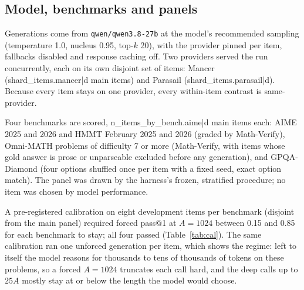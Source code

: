 \documentclass[11pt]{article}
\begin{document}
\subsection{Model, benchmarks and panels}

Generations come from \texttt{qwen/qwen3.8-27b} at the model's recommended sampling (temperature 1.0,
nucleus 0.95, top-$k$ 20), with the provider pinned per item, fallbacks disabled and response caching
off. Two providers served the run concurrently, each on its own disjoint set of items: Mancer
({{shard_items.mancer|d}} main items) and Parasail ({{shard_items.parasail|d}}). Because every item stays on
one provider, every within-item contrast is same-provider.

Four benchmarks are scored, {{n_items_by_bench.aime|d}} main items each: AIME 2025 and 2026 and HMMT
February 2025 and 2026 (graded by Math-Verify), Omni-MATH problems of difficulty 7 or more (Math-Verify,
with items whose gold answer is prose or unparseable excluded before any generation), and GPQA-Diamond
(four options shuffled once per item with a fixed seed, exact option match). The panel was drawn by the
harness's frozen, stratified procedure; no item was chosen by model performance.

A pre-registered calibration on eight development items per benchmark (disjoint from the main panel)
required forced pass@1 at $A=1024$ between 0.15 and 0.85 for each benchmark to stay; all four passed
(Table~\ref{tab:cal}). The same calibration ran one unforced generation per item, which shows the regime:
left to itself the model reasons for thousands to tens of thousands of tokens on these problems, so a
forced $A = 1024$ truncates each call hard, and the deep calls up to $25A$ mostly stay at or below the
length the model would choose.
\end{document}
